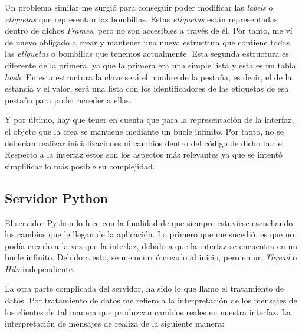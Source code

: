Un problema similar me surgió para conseguir poder modificar las \textit{labels} o \textit{etiquetas} que representan las bombillas. Estas \textit{etiquetas} están representadas dentro de dichos \textit{Frames}, pero no son accesibles a través de él. Por tanto, me ví de nuevo obligado a crear y mantener una nueva estructura que contiene todas las \textit{etiquetas} o bombillas que tenemos actualmente. Esta segunda estructura es diferente de la primera, ya que la primera era una simple lista y esta es un tabla \textit{hash}. En esta estructura la clave será el nombre de la pestaña, es decir, el de la estancia y el valor, será una lista con los identificadores de las etiquetas de esa pestaña para poder acceder a ellas.

Y por último, hay que tener en cuenta que para la representación de la interfaz, el objeto que la crea se mantiene mediante un bucle infinito. Por tanto, no se deberían realizar inicializaciones ni cambios dentro del código de dicho bucle. Respecto a la interfaz estos son los aspectos más relevantes ya que se intentó simplificar lo más posible su complejidad.

\subsection{Servidor Python}

El servidor Python lo hice con la finalidad de que siempre estuviese escuchando los cambios que le llegan de la aplicación. Lo primero que me sucedió, es que no podía crearlo a la vez que la interfaz, debido a que la interfaz se encuentra en un bucle infinito. Debido a esto, se me ocurrió crearlo al inicio, pero en un \textit{Thread} o \textit{Hilo} independiente. 

La otra parte complicada del servidor, ha sido lo que llamo el tratamiento de datos. Por tratamiento de datos me refiero a la interpretación de los mensajes de los clientes de tal manera que produzcan cambios reales en nuestra interfaz. La interpretación de mensajes de realiza de la siguiente manera:

